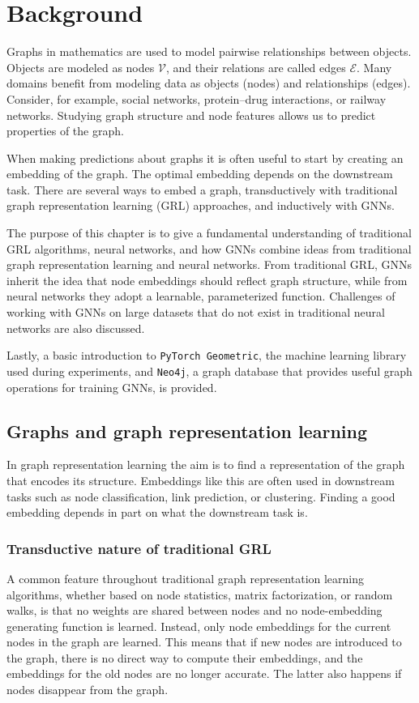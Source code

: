 \documentclass[PhD,single]{uclathes}
\begin{document}
\chapter{Background}

Graphs in mathematics are used to model pairwise relationships between objects.
Objects are modeled as nodes $\mathcal{V}$, and their relations are called
edges $\mathcal{E}$. Many domains benefit from modeling data as objects (nodes)
and relationships (edges). Consider, for example, social networks,
protein--drug interactions, or railway networks. Studying graph structure and
node features allows us to predict properties of the graph.

When making predictions about graphs it is often useful to start by creating an
embedding of the graph. The optimal embedding depends on the downstream task.
There are several ways to embed a graph, transductively with traditional graph
representation learning (GRL) approaches, and inductively with GNNs.

The purpose of this chapter is to give a fundamental understanding of
traditional GRL algorithms, neural networks, and how GNNs combine ideas from
traditional graph representation learning and neural networks. From traditional
GRL, GNNs inherit the idea that node embeddings should reflect graph structure,
while from neural networks they adopt a learnable, parameterized function.
Challenges of working with GNNs on large datasets that do not exist in
traditional neural networks are also discussed.

Lastly, a basic introduction to \texttt{PyTorch Geometric}, the machine
learning library used during experiments, and \texttt{Neo4j}, a graph database
that provides useful graph operations for training GNNs, is provided.

\section{Graphs and graph representation learning}\label{sec:traditional_grl}
In graph representation learning the aim is to find a representation of the
graph that encodes its structure. Embeddings like this are often used in
downstream tasks such as node classification, link prediction, or clustering.
Finding a good embedding depends in part on what the downstream task is.

\subsection{Transductive nature of traditional GRL}
A common feature throughout traditional graph representation learning
algorithms, whether based on node statistics, matrix factorization, or random
walks, is that no weights are shared between nodes and no node-embedding
generating function is learned. Instead, only node embeddings for the current
nodes in the graph are learned. This means that if new nodes are introduced to
the graph, there is no direct way to compute their embeddings, and the
embeddings for the old nodes are no longer accurate. The latter also happens if
nodes disappear from the graph.
\end{document}
